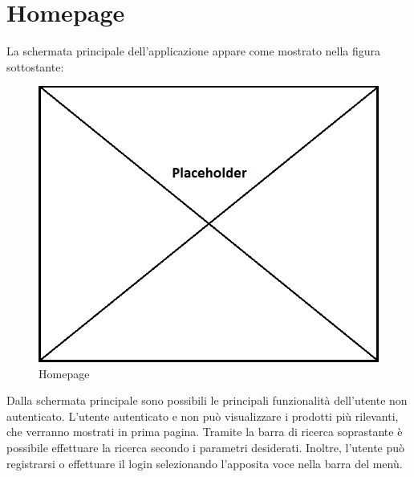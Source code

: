 \newpage
\section{Homepage}

La schermata principale dell'applicazione appare come mostrato nella figura sottostante:

\label{Homepage}
\begin{figure}[H]
	\centering
	\includegraphics[scale=0.45]{img/placeholder.png}
	\caption{Homepage}
\end{figure}

Dalla schermata principale sono possibili le principali funzionalità dell'utente non autenticato. L'utente autenticato e non può visualizzare i prodotti più rilevanti, che verranno mostrati in prima pagina. Tramite la barra di ricerca soprastante è possibile effettuare la ricerca secondo i parametri desiderati. Inoltre, l'utente può registrarsi o effettuare il login selezionando l'apposita voce nella barra del menù.

